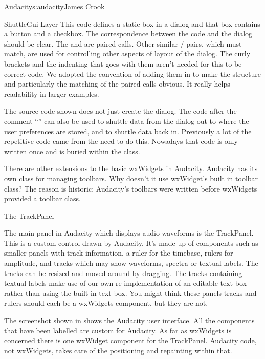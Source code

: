 \begin{aosachapter}{Audacity}{s:audacity}{James Crook}
\begin{aosasect1}{ShuttleGui Layer}
This code defines a static box in a dialog and that box contains a
button and a checkbox.  The correspondence between the code and the
dialog should be clear.  The  and 
are paired calls.  Other similar
/ pairs, which must match, are
used for controlling other aspects of layout of the dialog.  The curly
brackets and the indenting that goes with them aren't needed for this
to be correct code.  We adopted the convention of adding them in to
make the structure and particularly the matching of the paired calls
obvious.  It really helps readability in larger examples.

The source code shown does not just create the dialog.  The code after
the comment ``'' can also be used to shuttle
data from the dialog out to where the user preferences are stored, and
to shuttle data back in.  Previously a lot of the repetitive code came
from the need to do this.  Nowadays that code is only written once and
is buried within the  class.

There are other extensions to the basic wxWidgets in Audacity.
Audacity has its own class for managing toolbars.  Why doesn't it use
wxWidget's built in toolbar class?  The reason is historic: Audacity's
toolbars were written before wxWidgets provided a toolbar class.

\end{aosasect1}

\begin{aosasect1}{The TrackPanel}

The main panel in Audacity which displays audio waveforms is the
TrackPanel.  This is a custom control drawn by Audacity.  It's made up
of components such as smaller panels with track information, a ruler
for the timebase, rulers for amplitude, and tracks which may show
waveforms, spectra or textual labels.  The tracks can be resized and
moved around by dragging.  The tracks containing textual labels make
use of our own re-implementation of an editable text box rather than
using the built-in text box.  You might think these panels tracks and
rulers should each be a wxWidgets component, but they are not.


The screenshot shown in  shows the Audacity user
interface.  All the components that have been labelled are custom for
Audacity.  As far as wxWidgets is concerned there is one wxWidget
component for the TrackPanel.  Audacity code, not wxWidgets, takes
care of the positioning and repainting within that.


\end{aosasect1}
\end{aosachapter}
